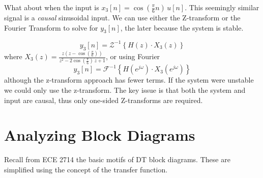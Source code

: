 \documentclass{article}
\begin{document}
What about when the input is $x_3[n] = \cos\left(\frac{\pi}{6}n\right)\, u[n]$. This seemingly similar signal is a \textit{causal} sinusoidal input. We can use either the Z-transform or the Fourier Transform to solve for $y_3[n]$, the later because the system is stable. 

\[
y_3[n] = \mathcal{Z}^{-1}\left\{ H(z)\cdot X_3(z)\right\} 
\]
where $X_3(z) = \frac{z\left(z-\cos\left(\frac{\pi}{6}\right)\right)}{z^2 - 2\cos\left(\frac{\pi}{6}\right)\, z + 1}$, or using Fourier
\[
y_3[n] = \mathcal{F}^{-1}\left\{ H\left(e^{j\omega}\right)\cdot X_3\left(e^{j\omega}\right)\right\}
\]
although the z-transform approach has fewer terms. If the system were unstable we could only use the z-transform. The key issue is that both the system and input are causal, thus only one-sided Z-transforms are required.

\section{Analyzing Block Diagrams}

Recall from ECE 2714 the basic motifs of DT block diagrams. These are simplified using the concept of the transfer function.
\end{document}
